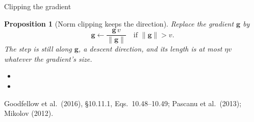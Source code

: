 \documentclass[aspectratio=169, 11pt]{beamer}
\newtheorem{propx}[theorem]{Proposition}
\newcommand{\srcline}[1]{%
  \par\vspace{0.25em}%
  {\scriptsize\color{mcMuted}\hfill #1\par}}
\newcommand{\src}[3]{}      %
\begin{document}
\begin{frame}{Clipping the gradient}
  \src{goodfellow2016}{equation}{10.48-10.49}
  \src{goodfellow2016}{section}{10.11.1}
  \src{pascanu2013}{section}{3.2}
  \src{pascanu2013}{section}{2.3}
  \vspace{-0.45em}
  \begin{propx}[Norm clipping keeps the direction]\label{th:clip}
    \small
    Replace the gradient $\mathbf{g}$ by
    \[
      \mathbf{g} \leftarrow \frac{\mathbf{g}\,v}{\|\mathbf{g}\|} \quad \text{if } \|\mathbf{g}\| > v .
    \]
    The step is still along $\mathbf{g}$, a descent direction, and its
    length is at most $\eta v$ whatever the gradient's size.
  \end{propx}
  \vspace{0.05em}
  {\footnotesize
  \begin{itemize}\itemsep0.2em
    \item {}
    \item {}
  \end{itemize}}
  \vspace{-0.3em}
  \srcline{Goodfellow et al.\ (2016), \S10.11.1, Eqs.~10.48--10.49; Pascanu et al.\ (2013); Mikolov (2012).}
\end{frame}
\end{document}
